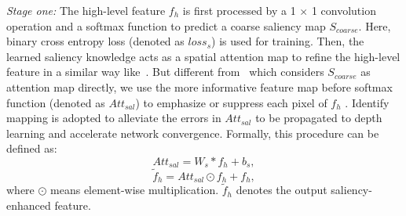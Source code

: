 \documentclass[runningheads]{llncs}
\begin{document}
\emph{ Stage one:}
The high-level feature $f_h$ is first processed by a 1 $\times$ 1 convolution operation and a softmax function to predict a coarse saliency map $S_{coarse}$.
Here, binary cross entropy loss (denoted as $loss_{s}$) is used for training.
Then, the learned saliency knowledge acts as a spatial attention map to refine the high-level feature in a similar way like~\cite{2DCPD}.
But different from~\cite{2DCPD} which considers $S_{coarse}$ as attention map directly, we use the more informative feature map before softmax function (denoted as $Att_{sal}$) to emphasize or suppress each pixel of $f_h$ .
Identify mapping is adopted to alleviate the errors in $Att_{sal}$ to be propagated to depth learning and accelerate network convergence.
Formally, this procedure can be defined as:
\begin{equation}
Att_{sal}= W_s*f_h+b_s,
\end{equation}
\begin{equation}
\widetilde{f}_h = Att_{sal}\odot f_h + f_h,
\end{equation}
where $\odot$ means element-wise multiplication. $\widetilde{f}_h$ denotes the output saliency-enhanced feature.
\end{document}
